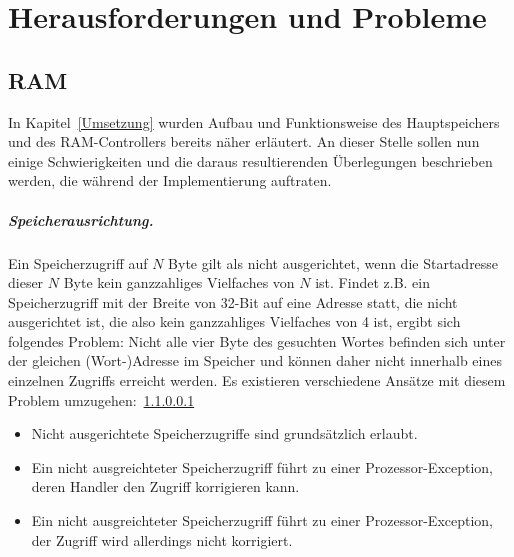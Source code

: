 \chapter{Herausforderungen und Probleme} %
\label{Probleme} %

\section{RAM}

In Kapitel~\ref{Umsetzung} wurden Aufbau und Funktionsweise des Hauptspeichers und des RAM-Controllers bereits näher erläutert.
An dieser Stelle sollen nun einige Schwierigkeiten und die daraus resultierenden Überlegungen beschrieben werden, die während der Implementierung auftraten.

\paragraph{Speicherausrichtung.} 
Ein Speicherzugriff auf $N$ Byte gilt als nicht ausgerichtet, wenn die Startadresse dieser $N$ Byte kein ganzzahliges Vielfaches von $N$ ist.
Findet z.B. ein Speicherzugriff mit der Breite von 32-Bit auf eine Adresse statt, die nicht ausgerichtet ist, die also kein ganzzahliges Vielfaches von 4 ist, ergibt sich folgendes Problem:
Nicht alle vier Byte des gesuchten Wortes befinden sich unter der gleichen (Wort-)Adresse im Speicher und können daher nicht innerhalb eines einzelnen Zugriffs erreicht werden.
Es existieren verschiedene Ansätze mit diesem Problem umzugehen:~\ref{}
\begin{itemize}
    \item Nicht ausgerichtete Speicherzugriffe sind grundsätzlich erlaubt.
    \item Ein nicht ausgreichteter Speicherzugriff führt zu einer Prozessor-Exception, deren Handler den Zugriff korrigieren kann.
    \item Ein nicht ausgreichteter Speicherzugriff führt zu einer Prozessor-Exception, der Zugriff wird allerdings nicht korrigiert.
\end{itemize}

